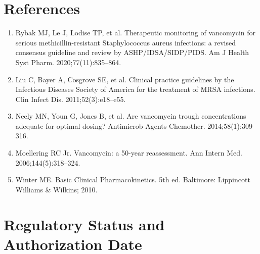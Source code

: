 \section*{References}
\begin{enumerate}
  \item Rybak MJ, Le J, Lodise TP, et al. Therapeutic monitoring of vancomycin for serious methicillin-resistant Staphylococcus aureus infections: a revised consensus guideline and review by ASHP/IDSA/SIDP/PIDS. Am J Health Syst Pharm. 2020;77(11):835--864.
  \item Liu C, Bayer A, Cosgrove SE, et al. Clinical practice guidelines by the Infectious Diseases Society of America for the treatment of MRSA infections. Clin Infect Dis. 2011;52(3):e18--e55.
  \item Neely MN, Youn G, Jones B, et al. Are vancomycin trough concentrations adequate for optimal dosing? Antimicrob Agents Chemother. 2014;58(1):309--316.
  \item Moellering RC Jr. Vancomycin: a 50-year reassessment. Ann Intern Med. 2006;144(5):318--324.
  \item Winter ME. Basic Clinical Pharmacokinetics. 5th ed. Baltimore: Lippincott Williams \& Wilkins; 2010.
\end{enumerate}

\clearpage
\section*{Regulatory Status and Authorization Date}

\clearpage
